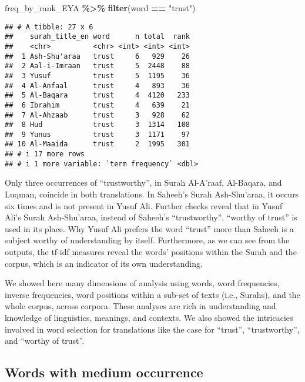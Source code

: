 \documentclass[
]{article}
\newenvironment{Shaded}{\begin{snugshade}}{\end{snugshade}}
\newcommand{\FunctionTok}[1]{\textcolor[rgb]{0.13,0.29,0.53}{\textbf{#1}}}
\newcommand{\NormalTok}[1]{#1}
\newcommand{\SpecialCharTok}[1]{\textcolor[rgb]{0.81,0.36,0.00}{\textbf{#1}}}
\newcommand{\StringTok}[1]{\textcolor[rgb]{0.31,0.60,0.02}{#1}}
\begin{document}
\begin{Shaded}
\begin{Highlighting}[]
\NormalTok{freq\_by\_rank\_EYA }\SpecialCharTok{\%\textgreater{}\%} \FunctionTok{filter}\NormalTok{(word }\SpecialCharTok{==} \StringTok{"trust"}\NormalTok{)}
\end{Highlighting}
\end{Shaded}

\begin{verbatim}
## # A tibble: 27 x 6
##    surah_title_en word      n total  rank
##    <chr>          <chr> <int> <int> <int>
##  1 Ash-Shu'araa   trust     6   929    26
##  2 Aal-i-Imraan   trust     5  2448    88
##  3 Yusuf          trust     5  1195    36
##  4 Al-Anfaal      trust     4   893    36
##  5 Al-Baqara      trust     4  4120   233
##  6 Ibrahim        trust     4   639    21
##  7 Al-Ahzaab      trust     3   928    62
##  8 Hud            trust     3  1314   108
##  9 Yunus          trust     3  1171    97
## 10 Al-Maaida      trust     2  1995   301
## # i 17 more rows
## # i 1 more variable: `term frequency` <dbl>
\end{verbatim}

\normalsize

Only three occurrences of ``trustworthy'', in Surah Al-A'raaf, Al-Baqara, and Luqman, coincide in both translations. In Saheeh's Surah Ash-Shu'araa, it occurs six times and is not present in Yusuf Ali. Further checks reveal that in Yusuf Ali's Surah Ash-Shu'araa, instead of Saheeh's ``trustworthy'', ``worthy of trust'' is used in its place. Why Yusuf Ali prefers the word ``trust'' more than Saheeh is a subject worthy of understanding by itself. Furthermore, as we can see from the outputs, the tf-idf measures reveal the words' positions within the Surah and the corpus, which is an indicator of its own understanding.

We showed here many dimensions of analysis using words, word frequencies, inverse frequencies, word positions within a sub-set of texts (i.e., Surahs), and the whole corpus, across corpora. These analyses are rich in understanding and knowledge of linguistics, meanings, and contexts. We also showed the intricacies involved in word selection for translations like the case for ``trust'', ``trustworthy'', and ``worthy of trust''.

\hypertarget{words-with-medium-occurrence}{%
\subsection{Words with medium occurrence}\label{words-with-medium-occurrence}}
\end{document}
